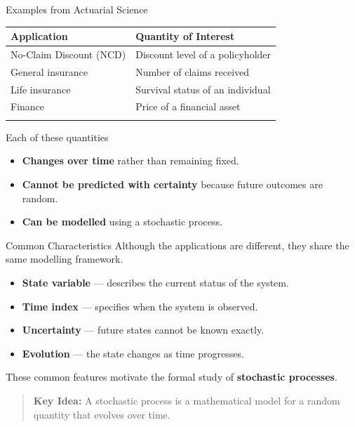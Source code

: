 \documentclass[
  ignorenonframetext,
  aspectratio=169,
]{beamer}
\newcounter{none} %
\providecommand{\tightlist}{%
  \setlength{\itemsep}{0pt}\setlength{\parskip}{0pt}}
\begin{document}
\begin{frame}{Examples from Actuarial Science}
\protect{}\label{examples-from-actuarial-science}
{\def\LTcaptype{none} %
\begin{longtable}[]{@{}ll@{}}
\toprule\noalign{}
Application & Quantity of Interest \\
\midrule\noalign{}
\endhead
No-Claim Discount (NCD) & Discount level of a policyholder \\
General insurance & Number of claims received \\
Life insurance & Survival status of an individual \\
Finance & Price of a financial asset \\
\bottomrule\noalign{}
\end{longtable}
}

Each of these quantities

\begin{itemize}
\tightlist
\item
  \textbf{Changes over time} rather than remaining fixed.
\item
  \textbf{Cannot be predicted with certainty} because future outcomes
  are random.
\item
  \textbf{Can be modelled} using a stochastic process.
\end{itemize}
\end{frame}

\begin{frame}{Common Characteristics}
\protect{}\label{common-characteristics}
Although the applications are different, they share the same modelling
framework.

\begin{itemize}
\tightlist
\item
  \textbf{State variable} --- describes the current status of the
  system.
\item
  \textbf{Time index} --- specifies when the system is observed.
\item
  \textbf{Uncertainty} --- future states cannot be known exactly.
\item
  \textbf{Evolution} --- the state changes as time progresses.
\end{itemize}

These common features motivate the formal study of \textbf{stochastic
processes}.

\begin{quote}
\textbf{Key Idea:} A stochastic process is a mathematical model for a
random quantity that evolves over time.
\end{quote}
\end{frame}
\end{document}
